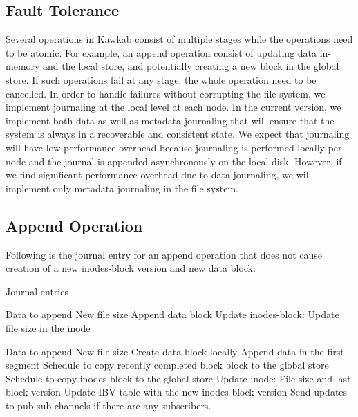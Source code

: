 \documentclass[]{article}
\begin{document}
\subsection{Fault Tolerance}

Several operations in Kawkab consist of multiple stages while the operations need 
to be atomic. For example, an append operation consist of updating data in-memory and
the local store, and potentially creating a new block in the global store. If such
operations fail at any stage, the whole operation need to be cancelled. In order
to handle failures without corrupting the file system, we implement journaling
at the local level at each node. In the current version, we implement both
data as well as metadata journaling that will ensure that the system is always
in a recoverable and consistent state. We expect that journaling will have low
performance overhead because journaling is performed locally per node and the
journal is appended asynchronously on the local disk. However, if we find significant
performance overhead due to data journaling, we will implement only metadata journaling
in the file system.

\subsection{Append Operation}

Following is the journal entry for an append operation that does not cause creation
of a new inodes-block version and new data block:

\begin{algorithm}
\caption{Journal entries}
\begin{algorithmic}[1]
\item[]
\State Data to append
\State New file size
\State Append data block
\State Update inodes-block: Update file size in the inode
\EndStruct
\item[]

\State Data to append
\State New file size
\State Create data block locally
\State Append data in the first segment
\State Schedule to copy recently completed block block to the global store
\State Schedule to copy inodes block to the global store
\State Update inode: File size and last block version
\State Update IBV-table with the new inodes-block version
\State Send updates to pub-sub channels if there are any subscribers.
\EndStruct
\end{algorithmic}
\end{algorithm}
\end{document}

